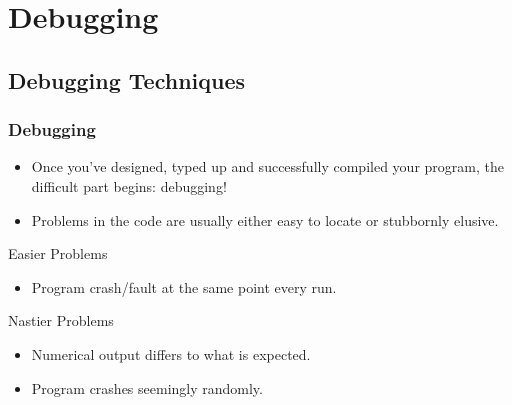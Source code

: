 \documentclass[smaller,handout,table]{beamer}
\begin{document}
\section{Debugging}
\subsection{Debugging Techniques}
\begin{frame}
\frametitle{Debugging}
\begin{itemize}
\item Once you've designed, typed up and successfully compiled your program, the difficult part begins: debugging!
\item Problems in the code are usually either easy to locate or stubbornly elusive.
\end{itemize}

\begin{exampleblock}{Easier Problems}
\begin{itemize}
\item Program crash/fault at the same point every run.
\end{itemize}
\end{exampleblock}

\begin{alertblock}{Nastier Problems}
\begin{itemize}
\item Numerical output differs to what is expected.
\item Program crashes seemingly randomly.
\end{itemize}
\end{alertblock}
\end{frame}
\end{document}
